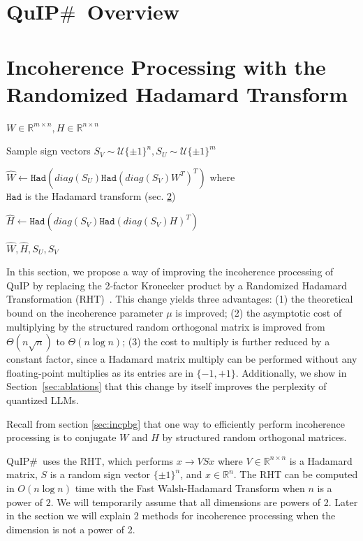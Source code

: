\section{QuIP$\#$\  Overview}

\section{Incoherence Processing with the Randomized Hadamard Transform}
\label{sec:RHT}

\begin{algorithm}[t]
\caption{Incoherence Processing with RHT (IP-RHT)}
\begin{algorithmic}
\INPUT $W \in \mathbb{R}^{m \times n}, H \in \mathbb{R}^{n \times n}$

\STATE Sample sign vectors $S_V \sim \mathcal{U}\{\pm1\}^n, S_U \sim \mathcal{U}\{\pm1\}^m$

\STATE $\hat W \gets \texttt{Had}(diag(S_U)\texttt{Had}(diag(S_V) W^T)^T)$ where 
\\  $\texttt{Had}$ is the Hadamard transform (sec. \ref{sec:RHT})

\STATE $\hat H \gets \texttt{Had}(diag(S_V) \texttt{Had}(diag(S_V) H)^T)$

\OUTPUT $\hat W, \hat H, S_U, S_V$
\end{algorithmic}
\label{alg:RHT}
\end{algorithm}

In this section, we propose a way of improving the incoherence processing of QuIP by replacing the 2-factor Kronecker product by a Randomized Hadamard Transformation (RHT)~\cite{halko2011finding}. This change yields three advantages: (1) the theoretical bound on the incoherence parameter $\mu$ is improved; (2) the asymptotic cost of multiplying by the structured random orthogonal matrix is improved from $\Theta(n \sqrt{n})$ to $\Theta(n \log n)$; (3) the cost to multiply is further reduced by a constant factor, since a Hadamard matrix multiply can be performed without any floating-point multiplies as its entries are in $\{-1,+1\}$.
Additionally, we show in Section~\ref{sec:ablations} that this change by itself improves the perplexity of quantized LLMs.

Recall from section \ref{sec:incpbg} that one way to efficiently perform incoherence processing is to conjugate $W$ and $H$ by structured random orthogonal matrices.

QuIP$\#$\  uses the RHT, which performs $x \to VSx$ where $V \in \mathbb{R}^{n \times n}$ is a Hadamard matrix, $S$ is a random sign vector $\{\pm 1\}^n$, and $x \in \mathbb{R}^n$.
The RHT can be computed in $O(n \log n)$ time with the Fast Walsh-Hadamard Transform \cite{fwht} when $n$ is a power of $2$. We will temporarily assume that all dimensions are powers of 2. Later in the section we will explain 2 methods for incoherence processing when the dimension is not a power of 2.

